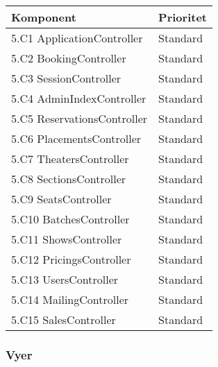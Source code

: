 \documentclass[a4paper, twoside, 11pt, titlepage]{article}
\begin{document}
		\begin {table} [ht] \begin{tabular} {  p{4cm} p{2cm} }
			\hline
			{ Komponent } & { Prioritet } \\
			\hline
			{ 5.C1 ApplicationController } & { Standard } \\
			\hline
			{ 5.C2 BookingController } & { Standard } \\
			\hline
			{ 5.C3 SessionController } & { Standard } \\
			\hline
			{ 5.C4 AdminIndexController } & { Standard } \\
			\hline
			{ 5.C5 ReservationsController } & { Standard } \\
			\hline
			{ 5.C6 PlacementsController } & { Standard } \\
			\hline
			{ 5.C7 TheatersController } & { Standard } \\
			\hline
			{ 5.C8 SectionsController } & { Standard } \\
			\hline
			{ 5.C9 SeatsController } & { Standard } \\
			\hline
			{ 5.C10 BatchesController } & { Standard } \\
			\hline
			{ 5.C11 ShowsController } & { Standard } \\
			\hline
			{ 5.C12 PricingsController } & { Standard } \\
			\hline
			{ 5.C13 UsersController } & { Standard } \\
			\hline
			{ 5.C14 MailingController } & { Standard } \\
			\hline
			{ 5.C15 SalesController } & { Standard } \\
			\hline
		\end{tabular} \end{table} \FloatBarrier


		\subsubsection{Vyer}
\end{document}
